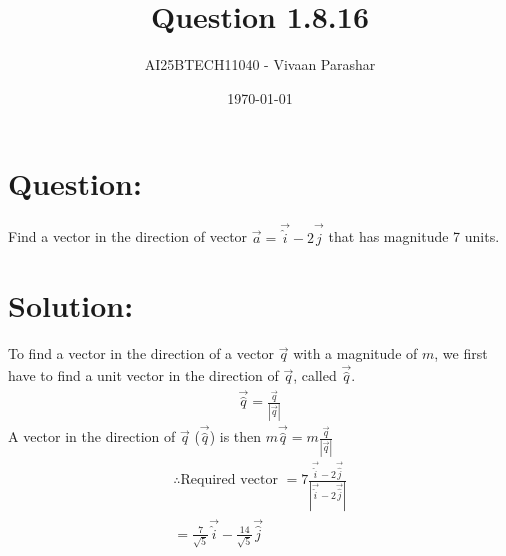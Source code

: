 \documentclass[a4paper, 12pt]{article}
\title{Question 1.8.16}
\author{AI25BTECH11040 - Vivaan Parashar}
\date{\today}
\begin{document}
\maketitle

\section{Question: }
Find a vector in the direction of vector $\vec{a} = \vec{\hat{i}} - 2\vec{\hat{j}}$ that has magnitude 7 units.

\section{Solution: }
To find a vector in the direction of a vector $\vec{q}$ with a magnitude of $m$, we first have to find a unit vector in the direction of $\vec{q}$, called $\vec{\hat{q}}$.
\begin{align}
    \vec{\hat{q}} = \frac{\vec{q}}{|\vec{q}|}
\end{align}
A vector in the direction of $\vec{q}$ ($\vec{\hat{q}}$) is then $m \vec{\hat{q}} = m\frac{\vec{q}}{|\vec{q}|}$
\begin{align}
    \therefore \text{Required vector } = 7\frac{\vec{\hat{i}} - 2\vec{\hat{j}}}{|\vec{\hat{i}} - 2\vec{\hat{j}}|}\\
    = \frac{7}{\sqrt{5}}\vec{\hat{i}} - \frac{14}{\sqrt{5}}\vec{\hat{j}}
\end{align}
\end{document}
